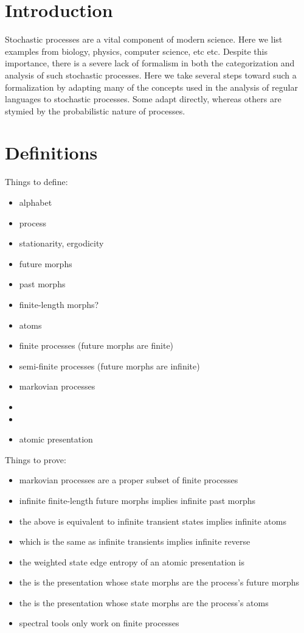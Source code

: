 \documentclass[prl,twocolumn,showpacs,superscriptaddress,preprintnumbers,floatfix]{revtex4-1}
\theoremstyle{plain}    \newtheorem{Lem}{Lemma}
\theoremstyle{plain}    \newtheorem*{ProLem}{Proof}
\theoremstyle{plain}    \newtheorem{Cor}{Corollary}
\theoremstyle{plain}    \newtheorem*{ProCor}{Proof}
\theoremstyle{plain}    \newtheorem{The}{Theorem}
\theoremstyle{plain}    \newtheorem*{ProThe}{Proof}
\theoremstyle{plain}    \newtheorem{Prop}{Proposition}
\theoremstyle{plain}    \newtheorem*{ProProp}{Proof}
\theoremstyle{plain}    \newtheorem*{Conj}{Conjecture}
\theoremstyle{plain}    \newtheorem*{Rem}{Remark}
\theoremstyle{plain}    \newtheorem{Def}{Definition}
\theoremstyle{plain}    \newtheorem*{Not}{Notation}
\begin{document}



\section{Introduction}
\label{sec:introduction}

Stochastic processes are a vital component of modern science. Here we list
examples from biology, physics, computer science, etc etc. Despite this
importance, there is a severe lack of formalism in both the categorization and
analysis of such stochastic processes. Here we take several steps toward such a
formalization by adapting many of the concepts used in the analysis of regular
languages to stochastic processes. Some adapt directly, whereas others are
stymied by the probabilistic nature of processes.

\section{Definitions}
\label{sec:definitions}

Things to define:
\begin{itemize}
  \item alphabet
  \item process
  \item stationarity, ergodicity
  \item future morphs
  \item past morphs
  \item finite-length morphs?
  \item atoms
  \item finite processes (future morphs are finite)
  \item semi-finite processes (future morphs are infinite)
  \item markovian processes
  \item \eM
  \item \eT
  \item atomic presentation
\end{itemize}

Things to prove:
\begin{itemize}
  \item markovian processes are a proper subset of finite processes
  \item infinite finite-length future morphs implies infinite past morphs
  \item the above is equivalent to infinite transient states implies infinite atoms
  \item which is the same as infinite transients implies infinite reverse \eM
  \item the weighted state edge entropy of an atomic presentation is \hmu
  \item the \eM is the presentation whose state morphs are the process's future morphs
  \item the \eT is the presentation whose state morphs are the process's atoms
  \item spectral tools only work on finite processes
\end{itemize}
\end{document}
